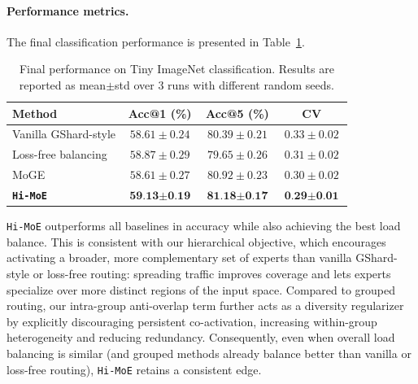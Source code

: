 \documentclass[sigconf,nonacm]{acmart}
\begin{document}
\paragraph{Performance metrics.} The final classification performance is presented in Table~\ref{tab:swin_results}. 
\begin{table}[!htbp]
\caption{Final performance on Tiny ImageNet classification. Results are reported as mean$\pm$std over 3 runs with different random seeds.}
\label{tab:swin_results}
\centering
\setlength{\tabcolsep}{3pt}
\begin{tabular}{lccc}
\toprule
\textbf{Method} & \textbf{Acc@1 (\%)} & \textbf{Acc@5 (\%)} & \textbf{CV}  \\
\midrule
Vanilla GShard-style & $58.61\pm 0.24$ & $80.39\pm 0.21$ & $0.33\pm 0.02$ \\
Loss-free balancing & $58.87\pm 0.29$ & $79.65\pm 0.26$ & $0.31\pm 0.02$ \\
MoGE & $58.61\pm 0.27$ & $80.92\pm 0.23$ & $0.30\pm 0.02$ \\
\midrule
\textbf{\texttt{Hi-MoE}} & $\textbf{59.13}\pm \textbf{0.19}$ & $\textbf{81.18}\pm \textbf{0.17}$ & $\textbf{0.29}\pm \textbf{0.01}$ \\
\bottomrule
\end{tabular}
\end{table}
\texttt{Hi-MoE} outperforms all baselines in accuracy while also achieving the best load balance. This is consistent with our hierarchical objective, which encourages activating a broader, more complementary set of experts than vanilla GShard-style or loss-free routing: spreading traffic improves coverage and lets experts specialize over more distinct regions of the input space. Compared to grouped routing, our intra-group anti-overlap term further acts as a diversity regularizer by explicitly discouraging persistent co-activation, increasing within-group heterogeneity and reducing redundancy. Consequently, even when overall load balancing is similar (and grouped methods already balance better than vanilla or loss-free routing), \texttt{Hi-MoE} retains a consistent edge.

\end{document}
